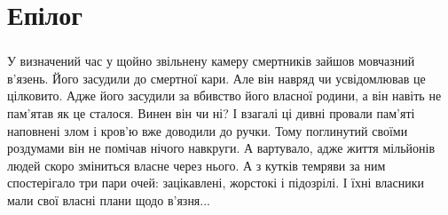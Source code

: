 \documentclass[a4paper,oneside]{book}
\begin{document}
\part*{Епілог}

\section*{}

У визначений час у щойно звільнену камеру смертників зайшов мовчазний
в’язень. Його засудили до смертної кари. Але він навряд чи усвідомлював це
цілковито. Адже його засудили за вбивство його власної родини, а він навіть не
пам’ятав як це сталося. Винен він чи ні? І взагалі ці дивні провали пам’яті
наповнені злом і кров’ю вже доводили до ручки. Тому поглинутий своїми
роздумами він не помічав нічого навкруги. А вартувало, адже життя мільйонів
людей скоро зміниться власне через нього. А з кутків темряви за ним
спостерігало три пари очей: зацікавлені, жорстокі і підозрілі. І їхні власники
мали свої власні плани щодо в’язня...


 
\end{document}

